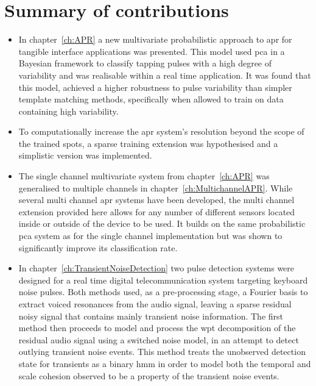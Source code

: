 \section{Summary of contributions}
\begin{itemize}
  \item In chapter~\ref{ch:APR} a new multivariate probabilistic approach to \gls{apr} for tangible interface applications was presented. This model used \gls{pca} in a Bayesian framework to classify tapping pulses with a high degree of variability and was realisable within a real time application. It was found that this model, achieved a higher robustness to pulse variability than simpler template matching methods, specifically when allowed to train on data containing high variability.
  \item To computationally increase the \gls{apr} system's resolution beyond the scope of the trained spots, a sparse training extension was hypothesised and a simplistic version was implemented.
  \item The single channel multivariate system from chapter~\ref{ch:APR} was generalised to multiple channels in chapter~\ref{ch:MultichannelAPR}. While several multi channel \gls{apr} systems have been developed, the multi channel extension provided here allows for any number of different sensors located inside or outside of the device to be used. It builds on the same probabilistic \gls{pca} system as for the single channel implementation but was shown to significantly improve its classification rate.
  \item In chapter~\ref{ch:TransientNoiseDetection} two pulse detection systems were designed for a real time digital telecommunication system targeting keyboard noise pulses. Both methods used, as a pre-processing stage, a Fourier basis to extract voiced resonances from the audio signal, leaving a sparse residual noisy signal that contains mainly transient noise information. The first method then proceeds to model and process the \gls{wpt} decomposition of the residual audio signal using a switched noise model, in an attempt to detect outlying transient noise events. This method treats the unobserved detection state for transients as a binary \gls{hmm} in order to model both the temporal and scale cohesion observed to be a property of the transient noise events.

\end{itemize}
